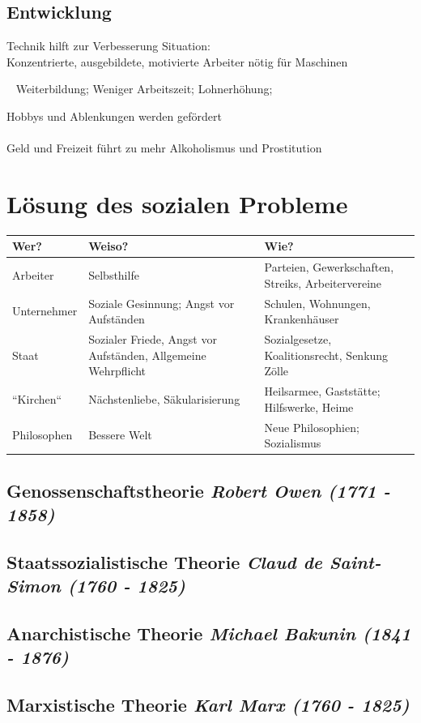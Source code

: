 \documentclass{report}
\begin{document}
\subsection{Entwicklung}
Technik hilft zur Verbesserung Situation:\\
Konzentrierte, ausgebildete, motivierte Arbeiter nötig für Maschinen\par
\arrow~ Weiterbildung; Weniger Arbeitszeit; Lohnerhöhung; \par Hobbys und Ablenkungen werden gefördert\\\\
Geld und Freizeit führt zu mehr Alkoholismus und Prostitution

\section{Lösung des sozialen Probleme}
\begin{tabular}{l | p{6cm} | p{8cm}}
\textbf{Wer?} & \textbf{Weiso?} & \textbf{Wie?} \\\hline
Arbeiter & Selbsthilfe & Parteien, Gewerkschaften, Streiks, Arbeitervereine \\\hline
Unternehmer & Soziale Gesinnung; Angst vor Aufständen & Schulen, Wohnungen, Krankenhäuser\\\hline
Staat & Sozialer Friede, Angst vor Aufständen, Allgemeine Wehrpflicht & Sozialgesetze, Koalitionsrecht, Senkung Zölle \\\hline
``Kirchen`` & Nächstenliebe, Säkularisierung & Heilsarmee, Gaststätte; Hilfswerke, Heime \\\hline
Philosophen & Bessere Welt & Neue Philosophien; Sozialismus
\end{tabular}

\subsection{Genossenschaftstheorie \rm{\textit{Robert Owen (1771 - 1858)}}}


\subsection{Staatssozialistische Theorie \rm{\textit{Claud de Saint-Simon (1760 - 1825)}}}


\subsection{Anarchistische Theorie \rm{\textit{Michael Bakunin (1841 - 1876)}}}


\subsection{Marxistische Theorie \rm{\textit{Karl Marx (1760 - 1825)}}}
\end{document}
